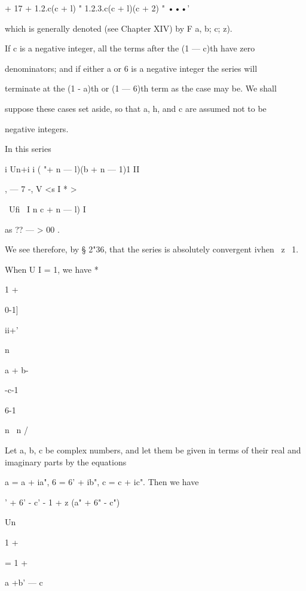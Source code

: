   + 17 + 1.2.c(c + l) " 1.2.3.c(c + l)(c + 2) " •••'

which is generally denoted (see Chapter XIV) by F a, b; c; z).

If c is a negative integer, all the terms after the (1 — c)th have
zero

denominators; and if either a or 6 is a negative integer the series
will

terminate at the (1 - a)th or (1 — 6)th term as the case may be. We
shall

suppose these cases set aside, so that a, h, and c are assumed not to
be

negative integers.

  In this series

i Un+i i ( "+ n — l)(b + n — 1)1 II

, — 7 -, V <s I * >

\ Ufi \ I n c + n — l) I

as ?? — > 00 .

We see therefore, by § 2"36, that the series is absolutely convergent
ivhen \ z\ < l, and divergent ivhen | | > 1.

When U I = 1, we have *






1 +



0-1]


ii+'


n


a + b-


-c-1



6-1



n \ n /






Let a, b, c be complex numbers, and let them be given in terms of
their real and imaginary parts by the equations

a = a + ia", 6 = 6' + ib", c = c + ic". Then we have

 ' + 6' - c' - 1 + z (a" + 6" - c")



Un



1 +



= 1 +



a +b' — c



